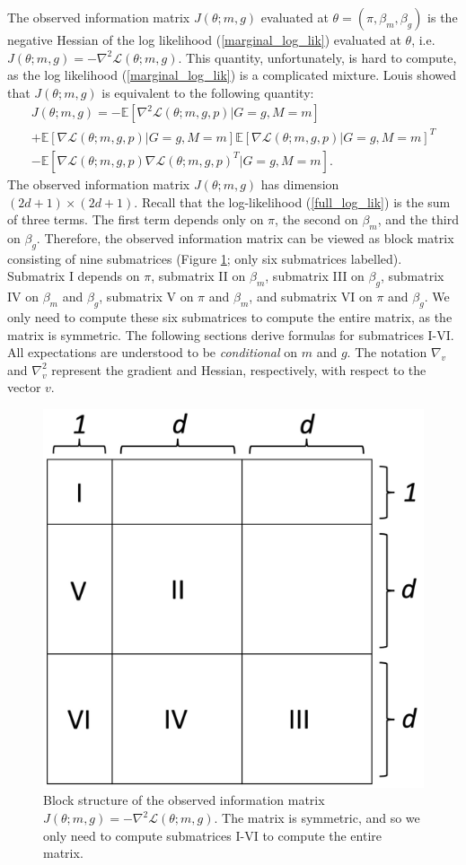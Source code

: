 \documentclass[12pt]{article}
\begin{document}
\begin{appendices}
\begin{refsection}
		The observed information matrix $J(\theta; m, g)$ evaluated at $\theta = (\pi, \beta_m, \beta_g)$ is the negative Hessian of the log likelihood (\ref{marginal_log_lik}) evaluated at $\theta$, i.e.
		$J(\theta; m, g) = - \nabla^2\mathcal{L}(\theta; m, g) .$ This quantity, unfortunately, is hard to compute, as the log likelihood (\ref{marginal_log_lik}) is a complicated mixture. Louis \cite{Louis1982} showed that $J(\theta; m, g)$ is equivalent to the following quantity:
		\begin{multline}\label{zero_inf_info_mat}
		J(\theta; m, g) = -\mathbb{E} \left[\nabla^2 \mathcal{L}(\theta; m, g, p) | G = g, M = m \right] \\ + \mathbb{E}\left[\nabla \mathcal{L}(\theta; m, g, p) | G = g, M = m \right] \mathbb{E}\left[\nabla \mathcal{L}(\theta; m, g, p) | G = g, M = m \right]^T \\ - \mathbb{E}\left[ \nabla\mathcal{L}(\theta; m, g, p) \nabla \mathcal{L}(\theta; m, g, p)^T | G = g, M = m \right].
		\end{multline}
		The observed information matrix $J(\theta; m, g)$ has dimension $(2d+1) \times (2d + 1).$ Recall that the log-likelihood (\ref{full_log_lik}) is the sum of three terms. The first term depends only on $\pi$, the second on $\beta_m$, and the third on $\beta_g$. Therefore, the observed information matrix can be viewed as block matrix consisting of nine submatrices (Figure \ref{infomatrixbackground}; only six submatrices labelled). Submatrix I depends on $\pi$, submatrix II on $\beta_m$, submatrix III on $\beta_g$, submatrix IV on $\beta_m$ and $\beta_g$, submatrix V on $\pi$ and $\beta_m$, and submatrix VI on $\pi$ and $\beta_g$. We only need to compute these six submatrices to compute the entire matrix, as the matrix is symmetric. The following sections derive formulas for submatrices I-VI. All expectations are understood to be \textit{conditional} on $m$ and $g$. The notation $\nabla_v$  and $\nabla^2_v$  represent the gradient and Hessian, respectively, with respect to the vector $v$.
		
		\begin{figure}
			\centering
			\includegraphics[width=0.45\linewidth]{figures/info_matrix_background}
			\caption{Block structure of the observed information matrix $J(\theta; m, g) = -\nabla^2 \mathcal{L}(\theta; m, g)$. The matrix is symmetric, and so we only need to compute submatrices I-VI to compute the entire matrix.}
			\label{infomatrixbackground}
		\end{figure}
		

\end{refsection}
\end{appendices}
\end{document}

